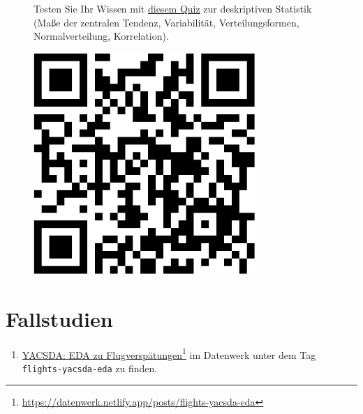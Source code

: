 \documentclass[
  a4paper,
]{scrbook}
\providecommand{\tightlist}{%
  \setlength{\itemsep}{0pt}\setlength{\parskip}{0pt}}\usepackage{longtable,booktabs,array}
\theoremstyle{definition}
\theoremstyle{definition}
\theoremstyle{definition}
\theoremstyle{remark}
\begin{document}
\begin{figure}

\begin{minipage}{0.80\linewidth}
Testen Sie Ihr Wissen mit
\href{https://forms.gle/w7eTW3ftKy8Hv3nw8}{diesem Quiz} zur deskriptiven
Statistik (Maße der zentralen Tendenz, Variabilität, Verteilungsformen,
Normalverteilung, Korrelation).\end{minipage}%
%
\begin{minipage}{0.20\linewidth}

\begin{center}
\includegraphics[width=0.75\textwidth,height=\textheight]{070-zusammenhaenge_files/figure-pdf/unnamed-chunk-31-1.pdf}
\end{center}

\end{minipage}%

\end{figure}%

\section{Fallstudien}\label{fallstudien-1}

\begin{enumerate}
\def\labelenumi{\arabic{enumi}.}
\tightlist
\item
  \href{https://datenwerk.netlify.app/posts/flights-yacsda-eda/}{YACSDA:
  EDA zu Flugverspätungen}\footnote{\url{https://datenwerk.netlify.app/posts/flights-yacsda-eda}}
  im Datenwerk unter dem Tag \texttt{flights-yacsda-eda} zu finden.
\end{enumerate}
\end{document}
